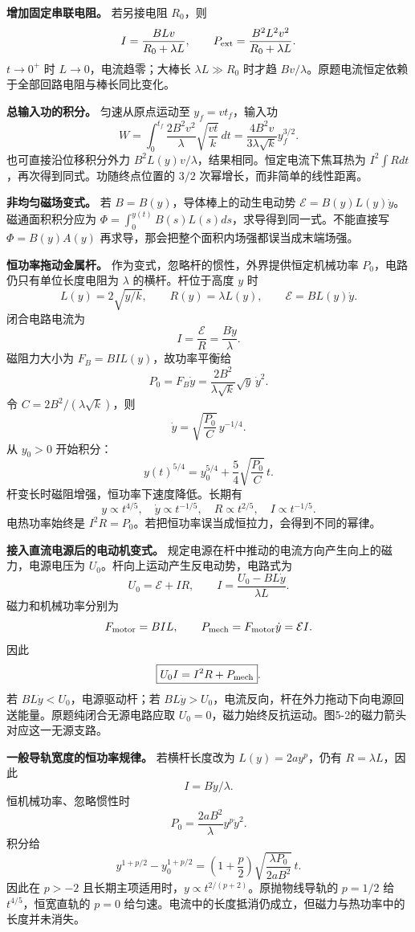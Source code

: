 \documentclass[12pt,a4paper,UTF8]{ctexart}
\begin{document}
\textbf{增加固定串联电阻。} 若另接电阻 \(R_0\)，则 \[
I=\frac{BLv}{R_0+\lambda L},\qquad
P_{\rm ext}=\frac{B^2L^2v^2}{R_0+\lambda L}.
\] \(t\to0^+\) 时 \(L\to0\)，电流趋零；大棒长 \(\lambda L\gg R_0\)
时才趋 \(Bv/\lambda\)。原题电流恒定依赖于全部回路电阻与棒长同比变化。

\textbf{总输入功的积分。} 匀速从原点运动至 \(y_f=vt_f\)，输入功 \[
W=\int_0^{t_f}\frac{2B^2v^2}{\lambda}\sqrt{\frac{vt}{k}}\,dt
=\frac{4B^2v}{3\lambda\sqrt k}y_f^{3/2}.
\] 也可直接沿位移积分外力
\(B^2L(y)v/\lambda\)，结果相同。恒定电流下焦耳热为
\(I^2\int Rdt\)，再次得到同式。功随终点位置的 \(3/2\)
次幂增长，而非简单的线性距离。

\textbf{非均匀磁场变式。} 若 \(B=B(y)\)，导体棒上的动生电动势
\(\mathcal E=B(y)L(y)\dot y\)。磁通面积积分应为
\(\Phi=\int_0^{y(t)}B(s)L(s)ds\)，求导得到同一式。不能直接写
\(\Phi=B(y)A(y)\) 再求导，那会把整个面积内场强都误当成末端场强。

\textbf{恒功率拖动金属杆。} 作为变式，忽略杆的惯性，外界提供恒定机械功率
\(P_0\)，电路仍只有单位长度电阻为 \(\lambda\) 的横杆。杆位于高度 \(y\)
时 \[
L(y)=2\sqrt{y/k},\qquad
R(y)=\lambda L(y),\qquad
\mathcal E=BL(y)\dot y.
\] 闭合电路电流为 \[
I=\frac{\mathcal E}{R}=\frac{B\dot y}{\lambda}.
\] 磁阻力大小为 \(F_B=BIL(y)\)，故功率平衡给 \[
P_0=F_B\dot y
=\frac{2B^2}{\lambda\sqrt k}\sqrt y\,\dot y^2.
\] 令 \(C=2B^2/(\lambda\sqrt k)\)，则 \[
\dot y=\sqrt{\frac{P_0}{C}}\,y^{-1/4}.
\] 从 \(y_0>0\) 开始积分： \[
\boxed{y(t)^{5/4}=y_0^{5/4}
+\frac54\sqrt{\frac{P_0}{C}}\,t}.
\] 杆变长时磁阻增强，恒功率下速度降低。长期有 \[
y\propto t^{4/5},\quad \dot y\propto t^{-1/5},
\quad R\propto t^{2/5},\quad I\propto t^{-1/5}.
\] 电热功率始终是
\(I^2R=P_0\)。若把恒功率误当成恒拉力，会得到不同的幂律。

\textbf{接入直流电源后的电动机变式。}
规定电源在杆中推动的电流方向产生向上的磁力，电源电压为
\(U_0\)。杆向上运动产生反电动势，电路式为 \[
U_0=\mathcal E+IR,\qquad
I=\frac{U_0-BL\dot y}{\lambda L}.
\] 磁力和机械功率分别为 \[
F_{\rm motor}=BIL,\qquad
P_{\rm mech}=F_{\rm motor}\dot y=\mathcal E I.
\] 因此 \[
\boxed{U_0I=I^2R+P_{\rm mech}}.
\] 若 \(BL\dot y<U_0\)，电源驱动杆；若
\(BL\dot y>U_0\)，电流反向，杆在外力拖动下向电源回送能量。原题纯闭合无源电路应取
\(U_0=0\)，磁力始终反抗运动。图5-2的磁力箭头对应这一无源支路。

\textbf{一般导轨宽度的恒功率规律。} 若横杆长度改为 \(L(y)=2a y^p\)，仍有
\(R=\lambda L\)，因此 \[
I=B\dot y/\lambda.
\] 恒机械功率、忽略惯性时 \[
P_0=\frac{2aB^2}{\lambda}y^p\dot y^2.
\] 积分给 \[
y^{1+p/2}-y_0^{1+p/2}
=\left(1+\frac p2\right)
\sqrt{\frac{\lambda P_0}{2aB^2}}\,t.
\] 因此在 \(p>-2\)
且长期主项适用时，\(y\propto t^{2/(p+2)}\)。原抛物线导轨的 \(p=1/2\) 给
\(t^{4/5}\)，恒宽直轨的 \(p=0\)
给匀速。电流中的长度抵消仍成立，但磁力与热功率中的长度并未消失。
\end{document}
